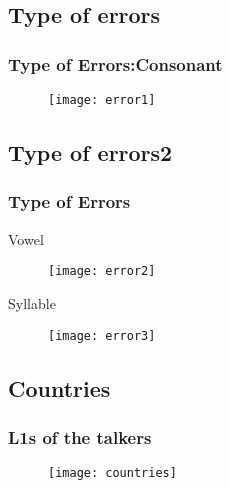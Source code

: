 \documentclass{beamer}
\begin{document}
\subsection{Type of errors}
\begin{frame}
\frametitle{Type of Errors:Consonant}
\begin{figure}
\texttt{[image: error1]}
\end{figure}
\end{frame}
\subsection{Type of errors2}
\begin{frame}
\frametitle{Type of Errors}
Vowel
\begin{figure}
\texttt{[image: error2]}
\end{figure}
Syllable
\begin{figure}
\texttt{[image: error3]}
\end{figure}
\end{frame}
\subsection{Countries}
\begin{frame}
\frametitle{L1s of the talkers}
\begin{figure}
\texttt{[image: countries]}
\end{figure}
\end{frame}
\end{document}
